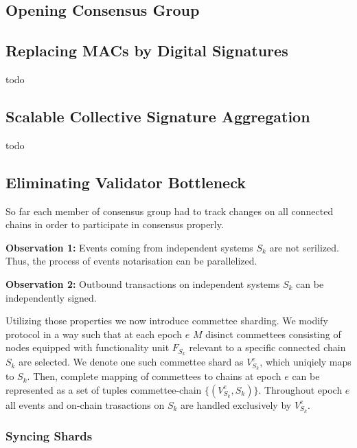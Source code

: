 \subsection{Opening Consensus Group}\label{subsec:opening-consensus-group}



\subsection{Replacing MACs by Digital Signatures}\label{subsec:replacing-macs-by-digital-signatures}

todo

\subsection{Scalable Collective Signature Aggregation}\label{subsec:scalable-collective-signature-aggregation}

todo

\subsection{Eliminating Validator Bottleneck}\label{subsec:eliminating-validator-bottleneck}

So far each member of consensus group had to track changes on all connected chains in order to participate in consensus properly.

\textbf{Observation 1:} Events coming from independent systems $S_k$ are not serilized.
Thus, the process of events notarisation can be parallelized.

\textbf{Observation 2:} Outbound transactions on independent systems $S_k$ can be independently signed.

Utilizing those properties we now introduce commettee sharding.
We modify protocol in a way such that at each epoch $e$ $M$ disinct commettees consisting of nodes equipped with functionality unit $F_{S_k}$ relevant to a specific connected chain $S_k$ are selected.
We denote one such commettee shard as $V^{e}_{S_k}$, which uniqiely maps to $S_k$.
Then, complete mapping of commettees to chains at epoch $e$ can be represented as a set of tuples commettee-chain $\{(V^{e}_{S_k}, S_k)\}$.
Throughout epoch $e$ all events and on-chain trasactions on $S_k$ are handled exclusively by $V^{e}_{S_k}$.

\subsubsection{Syncing Shards}


